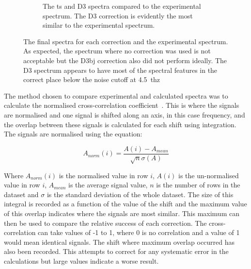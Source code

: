 \begin{figure}
\begin{subfigure}{1\textwidth}
    \caption{The \acrshort{ts} and D3 spectra compared to the experimental spectrum. The D3 correction is evidently the most similar to the experimental spectrum.}
    \label{fig:exp_d3_ts}
\end{subfigure}
\captionsetup{font = footnotesize, justification = centering}
\caption[The Calculated Terahertz Absorption Spectra for each Dispersion Correction and the Experimental Spectrum]{The final spectra for each correction and the experimental spectrum. As expected, the spectrum where no correction was used is not acceptable but the D3\acrshort{bj} correction also did not perform ideally. The D3 spectrum appears to have most of the spectral features in the correct place below the noise cutoff at \SI{4.5}{\acrshort{thz}}}
\label{fig:vdw_results}
\end{figure}

The method chosen to compare experimental and calculated spectra was to calculate the normalised cross\nobreakdash-correlation coefficient~\cite{Kendrick2020}. This is where the signals are normalised and one signal is shifted along an axis, in this case frequency, and the overlap between these signals is calculated for each shift using integration. The signals are normalised using the equation:

\begin{equation}
A_{norm}(i) = \frac{A(i) - A_{mean}}{\sqrt{n}\sigma(A)}
\end{equation}

Where \(A_{norm}(i)\) is the normalised value in row \(i\), \(A(i)\) is the un\nobreakdash-normalised value in row \(i\), \(A_{mean}\) is the average signal value, \(n\) is the number of rows in the dataset and \(\sigma\) is the standard deviation of the whole dataset. The size of this integral is recorded as a function of the value of the shift and the maximum value of this overlap indicates where the signals are most similar. This maximum can then be used to compare the relative success of each correction. The cross\nobreakdash-correlation can take values of -1 to 1, where 0 is no correlation and a value of 1 would mean identical signals. The shift where maximum overlap occurred has also been recorded. This attempts to correct for any systematic error in the calculations but large values indicate a worse result.

